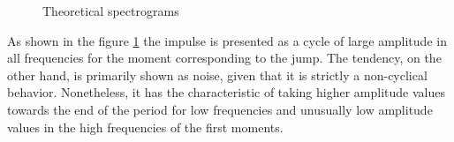 \documentclass[a4paper,10cpi]{article}
\begin{document}
\begin{figure}[H]
		\vspace{0.00mm}
		\vspace{0.00mm}
		\vspace{0.00mm}
		\caption{Theoretical spectrograms} \label{fig:espect_teo}
	\end{figure}
	
	As shown in the figure \ref{fig:espect_teo} the impulse is presented as a cycle of large amplitude in all frequencies for the moment corresponding to the jump. The tendency, on the other hand, is primarily shown as noise, given that it is strictly a non-cyclical behavior. Nonetheless, it has the characteristic of taking higher amplitude values towards the end of the period for low frequencies and unusually low amplitude values in the high frequencies of the first moments.
	
\end{document}
